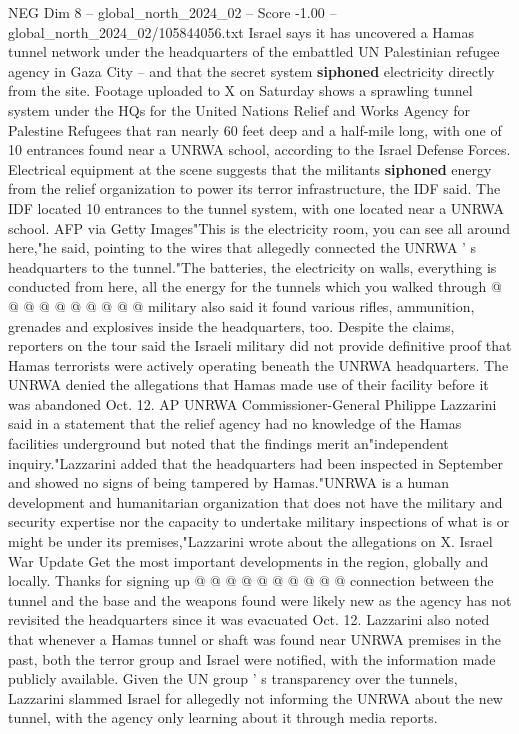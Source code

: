 \begin{textsample}{NEG Dim 8 – global\_north\_2024\_02 – Score -1.00 – global\_north\_2024\_02/105844056.txt}  \label{ex:f8_neg_436}
Israel says it has uncovered a Hamas tunnel network under the headquarters of the embattled UN Palestinian refugee agency in Gaza City -- and that the secret system \textbf{siphoned} electricity directly from the site.
Footage uploaded to X on Saturday shows a sprawling tunnel system under the HQs for the United Nations Relief and Works Agency for Palestine Refugees that ran nearly 60 feet deep and a half-mile long, with one of 10 entrances found near a UNRWA school, according to the Israel Defense Forces.
Electrical equipment at the scene suggests that the militants \textbf{siphoned} energy from the relief organization to power its terror infrastructure, the IDF said.
The IDF located 10 entrances to the tunnel system, with one located near a UNRWA school.
AFP via Getty Images"This is the electricity room, you can see all around here,"he said, pointing to the wires that allegedly connected the UNRWA ' s headquarters to the tunnel."The batteries, the electricity on walls, everything is conducted from here, all the energy for the tunnels which you walked through @ @ @ @ @ @ @ @ @ @ military also said it found various rifles, ammunition, grenades and explosives inside the headquarters, too.
Despite the claims, reporters on the tour said the Israeli military did not provide definitive proof that Hamas terrorists were actively operating beneath the UNRWA headquarters.
The UNRWA denied the allegations that Hamas made use of their facility before it was abandoned Oct. 12.
AP UNRWA Commissioner-General Philippe Lazzarini said in a statement that the relief agency had no knowledge of the Hamas facilities underground but noted that the findings merit an"independent inquiry."Lazzarini added that the headquarters had been inspected in September and showed no signs of being tampered by Hamas."UNRWA is a human development and humanitarian organization that does not have the military and security expertise nor the capacity to undertake military inspections of what is or might be under its premises,"Lazzarini wrote about the allegations on X.
Israel War Update Get the most important developments in the region, globally and locally.
Thanks for signing up @ @ @ @ @ @ @ @ @ @ connection between the tunnel and the base and the weapons found were likely new as the agency has not revisited the headquarters since it was evacuated Oct. 12.
Lazzarini also noted that whenever a Hamas tunnel or shaft was found near UNRWA premises in the past, both the terror group and Israel were notified, with the information made publicly available.
Given the UN group ' s transparency over the tunnels, Lazzarini slammed Israel for allegedly not informing the UNRWA about the new tunnel, with the agency only learning about it through media reports.

\end{textsample}
